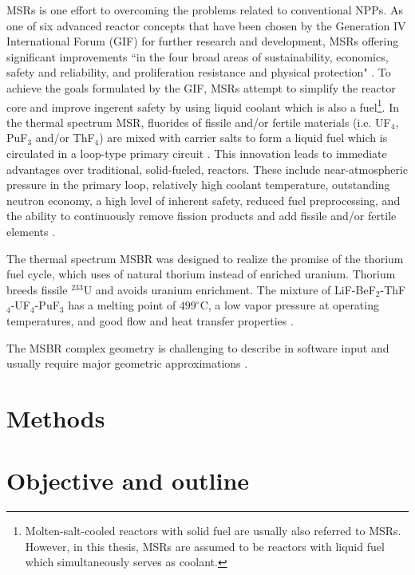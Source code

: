 \glspl{MSR} is one effort to overcoming the problems related to conventional \glspl{NPP}. As one of six advanced reactor concepts that have been chosen by the Generation IV International Forum (GIF) for further research and development, \glspl{MSR}  offering significant improvements ``in the four broad areas of sustainability, economics, safety and reliability, and proliferation resistance and physical protection" \cite{doe_technology_2002}. To achieve the goals formulated by the GIF, \glspl{MSR} attempt to simplify the reactor core and improve ingerent safety by using liquid coolant which is also a fuel\footnote{Molten-salt-cooled reactors with solid fuel are usually also referred to \glspl{MSR}. However, in this thesis, \glspl{MSR} are assumed to be reactors with liquid fuel which simultaneously serves as coolant.}. In the thermal spectrum \gls{MSR}, fluorides of fissile and/or fertile materials (i.e. UF$_4$, PuF$_3$ and/or ThF$_4$) are mixed with carrier salts to form a liquid fuel which is circulated in a loop-type primary circuit \cite{haubenreich_experience_1970}. This innovation leads to immediate advantages over traditional, solid-fueled, reactors. These include near-atmospheric pressure in the primary loop, relatively high coolant temperature, outstanding neutron economy, a high level of inherent safety, reduced fuel preprocessing, and the ability to continuously remove fission products and add fissile and/or fertile elements \cite{leblanc_molten_2010}. 

The thermal spectrum \gls{MSBR} was designed to realize the promise of the thorium fuel cycle, which uses of natural thorium instead of enriched uranium. Thorium breeds fissile $^{233}$U and avoids uranium enrichment. The mixture of LiF-BeF$_2$-ThF$_4$-UF$_4$-PuF$_3$ has a melting point of $499^\circ$C, a low vapor pressure at operating temperatures, and good flow and heat transfer properties \cite{robertson_conceptual_1971}. 

The \gls{MSBR} complex geometry is challenging to describe in software input and usually require major geometric 
approximations \cite{park_whole_2015}. 

\section{Methods}

\section{Objective and outline}

